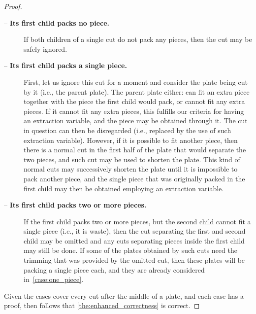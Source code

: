 \documentclass[ppgc,tese,english,formais,babel]{iiufrgs}
\begin{document}
\begin{proof}
\begin{description}
\item[ -- \textbf{Its first child packs no piece.}]
If both children of a single cut do not pack any pieces, then the cut may be safely ignored.
\item[ -- \textbf{Its first child packs a single piece.}]
First, let us ignore this cut for a moment and consider the plate being cut by it (i.e., the parent plate).
The parent plate either: can fit an extra piece together with the piece the first child would pack, or cannot fit any extra pieces.
If it cannot fit any extra pieces, this fulfills our criteria for having an extraction variable, and the piece may be obtained through it.
The cut in question can then be disregarded (i.e., replaced by the use of such extraction variable).
However, if it is possible to fit another piece, then there is a normal cut in the first half of the plate that would separate the two pieces, and such cut may be used to shorten the plate.
This kind of normal cuts may successively shorten the plate until it is impossible to pack another piece, and the single piece that was originally packed in the first child may then be obtained employing an extraction variable.
\item[ -- \textbf{Its first child packs two or more pieces.}]
If the first child packs two or more pieces, but the second child cannot fit a single piece (i.e., it is waste), then the cut separating the first and second child may be omitted and any cuts separating pieces inside the first child may still be done.
If some of the plates obtained by such cuts need the trimming that was provided by the omitted cut, then these plates will be packing a single piece each, and they are already considered in~\cref{case:one_piece}.
\end{description}

Given the cases cover every cut after the middle of a plate, and each case has a proof, then follows that \cref{the:enhanced_correctness} is correct.

\end{proof}
\end{document}
